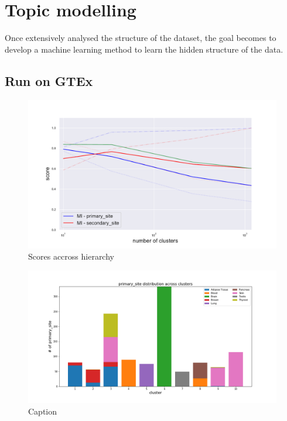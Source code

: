 \chapter{Topic modelling}\label{ch:topicmodelling}
Once extensively analysed the structure of the dataset, the goal becomes to develop a machine learning method to learn the hidden structure of the data.  






\section{Run on GTEx}
\begin{figure}[htb!]
    \centering
    \includegraphics[width=0.9\linewidth]{pictures/topic/gtex/oversigma_10tissue/metric_scores.pdf}
    \caption{Scores accross hierarchy}
    \label{fig:my_label}
\end{figure}

\begin{figure}[htb!]
    \centering
    \includegraphics[width=0.9\linewidth]{pictures/topic/gtex/oversigma_10tissue/clustercomposition_l3_primary_site.png}
    \caption{Caption}
    \label{fig:topic/gtex/oversigma_10tissue/clustercomposition_l2_primary_site}
\end{figure}

